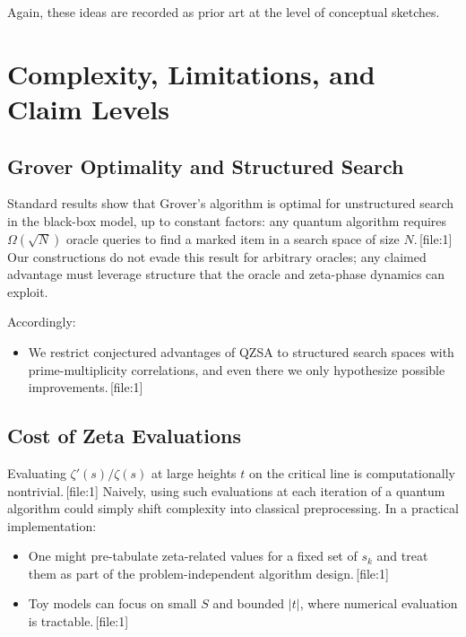 \documentclass[11pt]{article}
\begin{document}
Again, these ideas are recorded as prior art at the level of conceptual sketches.

\section{Complexity, Limitations, and Claim Levels}
\label{sec:complexity}

\subsection{Grover Optimality and Structured Search}

Standard results show that Grover's algorithm is optimal for unstructured search in the black-box model, up to constant factors: any quantum algorithm requires \(\Omega(\sqrt{N})\) oracle queries to find a marked item in a search space of size \(N\).\,[file:1] Our constructions do not evade this result for arbitrary oracles; any claimed advantage must leverage structure that the oracle and zeta-phase dynamics can exploit.

Accordingly:

\begin{itemize}[leftmargin=*]
    \item We restrict conjectured advantages of QZSA to structured search spaces with prime-multiplicity correlations, and even there we only hypothesize possible improvements.\,[file:1]
\end{itemize}

\subsection{Cost of Zeta Evaluations}

Evaluating \(\zeta'(s)/\zeta(s)\) at large heights \(t\) on the critical line is computationally nontrivial.\,[file:1] Naively, using such evaluations at each iteration of a quantum algorithm could simply shift complexity into classical preprocessing. In a practical implementation:

\begin{itemize}[leftmargin=*]
    \item One might pre-tabulate zeta-related values for a fixed set of \(s_k\) and treat them as part of the problem-independent algorithm design.\,[file:1]
    \item Toy models can focus on small \(S\) and bounded \(|t|\), where numerical evaluation is tractable.\,[file:1]
\end{itemize}
\end{document}
